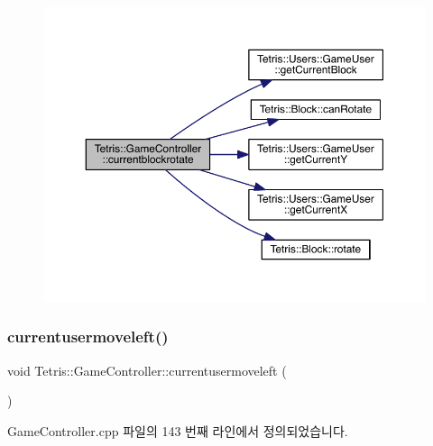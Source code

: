 \begin{figure}[H]
\begin{center}
\leavevmode
\includegraphics[width=350pt]{db/dd2/class_tetris_1_1_game_controller_a5d93facb945f87ba33fb8be74df023fa_cgraph}
\end{center}
\end{figure}
\mbox{\label{class_tetris_1_1_game_controller_ac0d40a0936505754131099034b4271fa}} 
\subsubsection{\texorpdfstring{currentusermoveleft()}{currentusermoveleft()}\hspace{0.1cm}{\footnotesize\ttfamily [1/2]}}
{\footnotesize\ttfamily void Tetris\+::\+Game\+Controller\+::currentusermoveleft (\begin{DoxyParamCaption}{ }\end{DoxyParamCaption})}



Game\+Controller.\+cpp 파일의 143 번째 라인에서 정의되었습니다.


